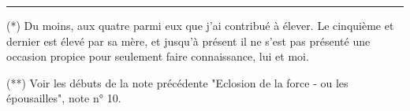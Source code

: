 \noindent\rule{.21\linewidth}{.35pt}

(*) Du moins, aux quatre parmi eux que j'ai contribué à élever. Le cinquième et dernier est élevé par sa mère, et jusqu'à présent il ne s'est pas présenté une occasion propice pour seulement faire connaissance, lui et moi.

(**) Voir les débuts de la note précédente "Eclosion de la force - ou les épousailles", note n° 10.

